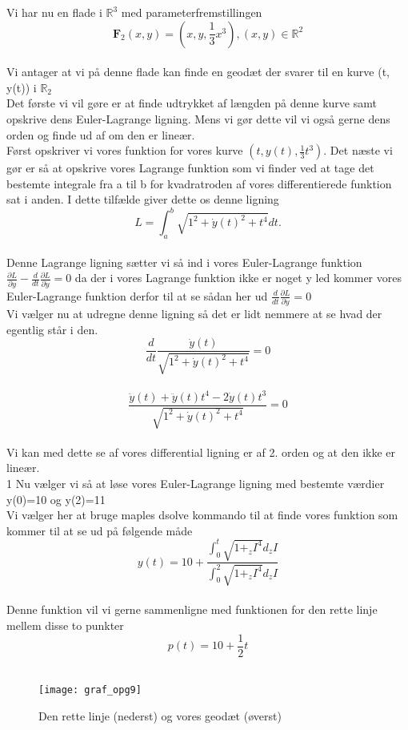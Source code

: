 
Vi har nu en flade i $\mathbb{R}^3$ med parameterfremstillingen \\
$$\textbf{F}_{2}(x,y)=(x, y, \frac{1}{3}x^3), (x,y) \in \mathbb{R}^2 $$\\
Vi antager at vi på denne flade kan finde en geodæt  der svarer til en kurve (t, y(t)) i $\mathbb{R}_{2}$ \\
Det første vi vil gøre er at finde udtrykket af længden på denne kurve samt opskrive dens Euler-Lagrange ligning. Mens vi gør dette vil vi også gerne dens orden og finde ud af om den er lineær. \\
Først opskriver vi vores funktion for vores kurve $(t,y(t), \frac{1}{3} t^3)$. Det næste vi gør er så at opskrive vores Lagrange funktion som vi finder ved at tage det bestemte integrale fra a til b for kvadratroden af vores differentierede funktion sat i anden. I dette tilfælde giver dette os denne ligning \\
$$L=\int_{a}^{b} \sqrt{1^2+ \dot{y}(t)^2+t^4}dt. $$\\
Denne Lagrange ligning sætter vi så ind i vores Euler-Lagrange funktion $ \frac{ \partial L}{ \partial y}-  \frac{d}{dt} \frac{ \partial L}{ \partial \dot{y}}=0$ da der i vores Lagrange funktion ikke er noget y led kommer vores Euler-Lagrange funktion derfor til at se sådan her ud $ \frac{d}{dt} \frac{ \partial L}{ \partial \dot{y}}=0 $\\
Vi vælger nu at udregne denne ligning så det er lidt nemmere at se hvad der egentlig står i den. \\
$$ \frac{d}{dt} \frac{ \dot{y}(t)}{ \sqrt{1^2+ \dot{y}(t)^2+t^4}}=0  $$\\
$$ \frac{ \ddot{y}(t)+ \ddot{y}(t)t^4-2 \dot{y}(t)t^3}{\sqrt{1^2+ \dot{y}(t)^2+t^4}}=0 $$\\
Vi kan med dette se af vores differential ligning er af 2. orden og at den ikke er lineær. \\1
Nu vælger vi så at løse vores Euler-Lagrange ligning med bestemte værdier y(0)=10 og y(2)=11 \\
Vi vælger her at bruge maples dsolve kommando til at finde vores funktion som kommer til at se ud på følgende måde \\
$$y(t)=10+ \frac{\int_{0}^{t}\sqrt{1+_zI^4}d_zI}{\int_{0}^{2}\sqrt{1+_zI^4}d_zI} $$ \\
Denne funktion vil vi gerne sammenligne med funktionen for den rette linje mellem disse to punkter \\
$$p(t)=10+ \frac{1}{2}t $$ \\
\begin{figure}
  \caption{Den rette linje (nederst) og vores geodæt (øverst)}
  \centering
    \texttt{[image: graf\_opg9]}
\end{figure} \\
